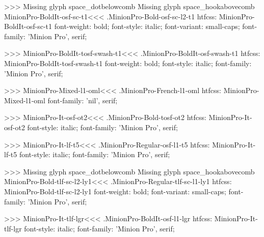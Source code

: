 {>>>
Missing glyph	space_dotbelowcomb
Missing glyph	space_hookabovecomb
\<MinionPro-BoldIt-osf-sc-t1\><<<
.MinionPro-Bold-osf-sc-l2-t1
htfcss:  MinionPro-BoldIt-osf-sc-t1  font-weight: bold; font-style: italic; font-variant: small-caps; font-family: 'Minion Pro', serif;

>>>
\<MinionPro-BoldIt-tosf-swash-t1\><<<
.MinionPro-BoldIt-osf-swash-t1
htfcss:  MinionPro-BoldIt-tosf-swash-t1  font-weight: bold; font-style: italic; font-family: 'Minion Pro', serif;

>>>
\<MinionPro-Mixed-l1-oml\><<<
.MinionPro-French-l1-oml
htfcss:  MinionPro-Mixed-l1-oml  font-family: 'nil', serif;

>>>
\<MinionPro-It-osf-ot2\><<<
.MinionPro-Bold-tosf-ot2
htfcss:  MinionPro-It-osf-ot2  font-style: italic; font-family: 'Minion Pro', serif;

>>>
\<MinionPro-It-lf-t5\><<<
.MinionPro-Regular-osf-l1-t5
htfcss:  MinionPro-It-lf-t5  font-style: italic; font-family: 'Minion Pro', serif;

>>>
Missing glyph	space_dotbelowcomb
Missing glyph	space_hookabovecomb
\<MinionPro-Bold-tlf-sc-l2-ly1\><<<
.MinionPro-Regular-tlf-sc-l1-ly1
htfcss:  MinionPro-Bold-tlf-sc-l2-ly1  font-weight: bold; font-variant: small-caps; font-family: 'Minion Pro', serif;

>>>
\<MinionPro-It-tlf-lgr\><<<
.MinionPro-BoldIt-osf-l1-lgr
htfcss:  MinionPro-It-tlf-lgr  font-style: italic; font-family: 'Minion Pro', serif;

}
